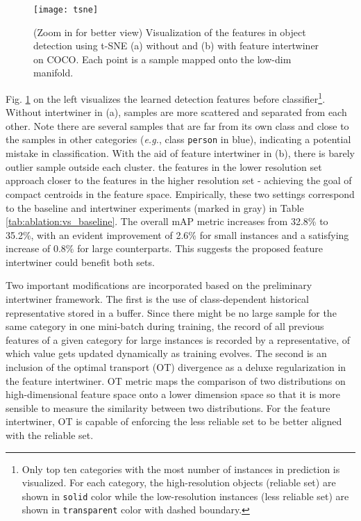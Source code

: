 \documentclass{article} \usepackage{iclr2019_conference,times}
\begin{document}
\begin{figure}
	\begin{minipage}[c]{0.7\textwidth}
\texttt{[image: tsne]}
	\end{minipage}\hfill
	\begin{minipage}[l]{0.28\textwidth}
\caption{
		(Zoom in for better view) Visualization of the features in object detection using t-SNE \citep{vanDerMaaten2008_tsne} (a) without and (b) with feature intertwiner on COCO.
		Each point is a sample mapped onto the low-dim manifold.
	}
	\label{fig:tsne}
\end{minipage}
\end{figure}
Fig. \ref{fig:tsne} on the left visualizes the learned detection features before classifier\footnote{Only top ten categories with the most number of instances in prediction is visualized. For each category, the high-resolution objects (reliable set) are shown in  \texttt{solid} color while the low-resolution instances (less reliable set) are shown in \texttt{transparent} color with dashed boundary.}. Without intertwiner in (a), samples are more scattered and separated from each other. Note there are several samples that are far from its own class and close to the samples in other categories (\textit{e.g.}, class \texttt{person} in blue), indicating a potential mistake in classification.
With the aid of feature intertwiner in (b), 
there is barely outlier sample outside each cluster.
the features in the lower resolution set approach closer to the features in the higher resolution set - achieving the goal of compact centroids in the feature space. Empirically, these two settings correspond to the baseline and intertwiner experiments (marked in gray) in Table \ref{tab:ablation:vs_baseline}. The overall mAP metric increases from 32.8\% to 35.2\%, with an evident improvement of 2.6\% for small instances and a satisfying increase of 0.8\% for large counterparts. This suggests the proposed feature intertwiner could benefit both sets. 








Two important modifications are incorporated based on the preliminary intertwiner framework. The first is the use of class-dependent historical representative stored in a buffer. Since there might be no large sample for the same category in one mini-batch during training,
the record of all previous features of a given category for large instances is recorded by a representative, of which value gets updated dynamically as training evolves.
The second is an inclusion of the optimal transport (OT) divergence as a deluxe regularization in the feature intertwiner. 
OT metric maps the comparison of two distributions on high-dimensional feature space onto a lower dimension space so that it is more sensible to measure the similarity between two distributions.
For the feature intertwiner, OT is capable of enforcing the less reliable set to be better aligned with the reliable set. 
\end{document}
